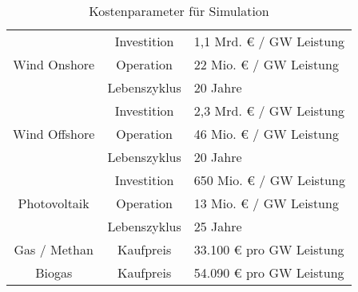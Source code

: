 \begin{table}[ht!]
    \centering
    \begin{tabular}{|ccl|}
    \hline
    \multicolumn{1}{|c|}{\multirow{3}{*}{Wind Onshore}} & \multicolumn{1}{c|}{Investition}   & 1,1 Mrd. € / GW Leistung \\ \cline{2-3} 
    \multicolumn{1}{|c|}{}                              & \multicolumn{1}{c|}{Operation}     & 22 Mio. € / GW Leistung  \\ \cline{2-3} 
    \multicolumn{1}{|c|}{}                              & \multicolumn{1}{c|}{Lebenszyklus}  & 20 Jahre                 \\ \hline
    \multicolumn{1}{|c|}{\multirow{3}{*}{Wind Offshore}} & \multicolumn{1}{c|}{Investition}  & 2,3 Mrd. € / GW Leistung \\ \cline{2-3} 
    \multicolumn{1}{|c|}{}                              & \multicolumn{1}{c|}{Operation}     & 46 Mio. € / GW Leistung  \\ \cline{2-3} 
    \multicolumn{1}{|c|}{}                              & \multicolumn{1}{c|}{Lebenszyklus}  & 20 Jahre                 \\ \hline
    \multicolumn{1}{|c|}{\multirow{3}{*}{Photovoltaik}} & \multicolumn{1}{c|}{Investition}   & 650 Mio. € / GW Leistung \\ \cline{2-3} 
    \multicolumn{1}{|c|}{}                              & \multicolumn{1}{c|}{Operation}     & 13 Mio. € / GW Leistung  \\ \cline{2-3} 
    \multicolumn{1}{|c|}{}                              & \multicolumn{1}{c|}{Lebenszyklus}  & 25 Jahre                 \\ \hline
    \multicolumn{1}{|c|}{Gas / Methan}                  & \multicolumn{1}{c|}{Kaufpreis}     & 33.100 € pro GW Leistung \\ \hline
    \multicolumn{1}{|c|}{Biogas}                        & \multicolumn{1}{c|}{Kaufpreis}     & 54.090 € pro GW Leistung \\ \hline
    \end{tabular}
    \caption{Kostenparameter für Simulation}
    \label{tab:my-table}
\end{table}

